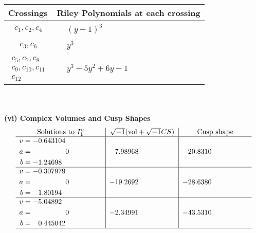 \documentclass[1p]{elsarticle_modified}
\theoremstyle{definition}
\newcommand{\I}{\sqrt{-1}}
\begin{document}
\begin{tabular}{m{50pt}|m{274pt}}
Crossings & \hspace{64pt}Riley Polynomials at each crossing \\
\hline $$\begin{aligned}c_{1},c_{2},c_{4}\end{aligned}$$&$\begin{aligned}
&(y-1)^3
\end{aligned}$\\
\hline $$\begin{aligned}c_{3},c_{6}\end{aligned}$$&$\begin{aligned}
&y^3
\end{aligned}$\\
\hline $$\begin{aligned}c_{5},c_{7},c_{8}\\c_{9},c_{10},c_{11}\\c_{12}\end{aligned}$$&$\begin{aligned}
&y^3-5 y^2+6 y-1
\end{aligned}$\\
\hline
\end{tabular}\\~\\
\newpage\flushleft \textbf{(vi) Complex Volumes and Cusp Shapes}
$$\begin{array}{c|c|c}  
\text{Solutions to }I^v_{1}& \I (\text{vol} + \sqrt{-1}CS) & \text{Cusp shape}\\
 \hline 
\begin{aligned}
v &= -0.643104\phantom{ +0.000000I} \\
a &= \phantom{-0.000000 } 0 \\
b &= -1.24698\phantom{ +0.000000I}\end{aligned}
 & -7.98968\phantom{ +0.000000I} & -20.8310\phantom{ +0.000000I} \\ \hline\begin{aligned}
v &= -0.307979\phantom{ +0.000000I} \\
a &= \phantom{-0.000000 } 0 \\
b &= \phantom{-}1.80194\phantom{ +0.000000I}\end{aligned}
 & -19.2692\phantom{ +0.000000I} & -28.6380\phantom{ +0.000000I} \\ \hline\begin{aligned}
v &= -5.04892\phantom{ +0.000000I} \\
a &= \phantom{-0.000000 } 0 \\
b &= \phantom{-}0.445042\phantom{ +0.000000I}\end{aligned}
 & -2.34991\phantom{ +0.000000I} & -43.5310\phantom{ +0.000000I}\\
 \hline 
 \end{array}$$\newpage
\end{document}
